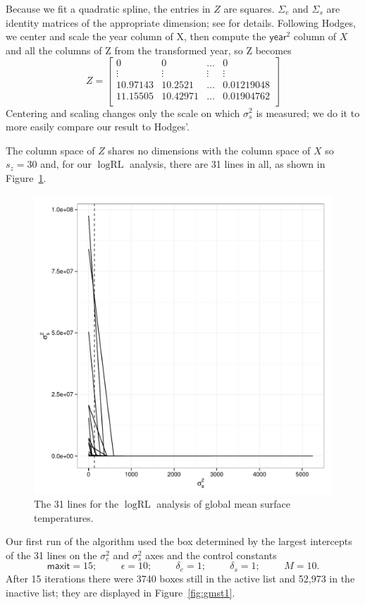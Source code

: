 \documentclass{report}
\newcommand{\textcompute}{\textsf}
\newcommand{\RLorig}{\text{RL}}
\newcommand{\logRLorig}{\log\RLorig}
\newcommand{\sigssq}{\sigma_s^2}
\newcommand{\sigesq}{\sigma_e^2}
\newcommand{\maxit}{\textcompute{maxit}}
\begin{document}
Because we fit a quadratic spline, the entries in $Z$ are squares.  $\Sigma_e$ and $\Sigma_s$ are identity matrices of the appropriate dimension; see \cite{hodges:2013} for details.  Following Hodges, we center and scale the \textcompute{year} column of X, then compute the $\textcompute{year}^2$ column of $X$ and all the columns of Z from the transformed \textcompute{year}, so Z becomes
\begin{equation*}
Z =	\begin{bmatrix} 
		0 & 0 & \dots & 0\\
		\vdots & \vdots & \vdots & \vdots\\
		10.97143 & 10.2521 & \dots & 0.01219048\\
		11.15505 & 10.42971 & \dots & 0.01904762\\
	\end{bmatrix}
\end{equation*}
Centering and scaling changes only the scale on which $\sigssq$ is measured; we do it to more easily compare our result to Hodges'.

The column space of $Z$ shares no dimensions with the column space of $X$ so $s_z=30$ and, for our $\logRLorig$ analysis, there are 31 lines in all, as shown in Figure~\ref{fig:gmst-lines}.
\begin{figure}
	\centering
	\includegraphics[width=.5\linewidth]{figs/gmst-lines.pdf}
	\caption{The 31 lines for the $\logRLorig$ analysis of
	              global mean surface temperatures.}
	\label{fig:gmst-lines}
\end{figure}
Our first run of the algorithm used the box determined by the largest intercepts of the 31 lines on the $\sigesq$ and $\sigssq$ axes and the control constants 
\begin{equation*}
	\maxit=15; \hspace{1cm} \epsilon=10; \hspace{1cm}
	\delta_e=1; \hspace{1cm} \delta_s=1; \hspace{1cm} M=10.
\end{equation*}
After 15 iterations there were 3740 boxes still in the active list and 52,973 in the inactive list; they are displayed in Figure~\ref{fig:gmst1}.
\end{document}
